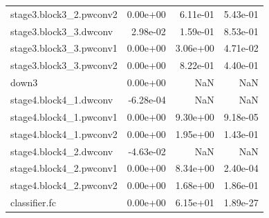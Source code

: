 \begin{longtable}{lrrr}
stage3.block3_2.pwconv2 & 0.00e+00 & 6.11e-01 & 5.43e-01 \\
stage3.block3_3.dwconv & 2.98e-02 & 1.59e-01 & 8.53e-01 \\
stage3.block3_3.pwconv1 & 0.00e+00 & 3.06e+00 & 4.71e-02 \\
stage3.block3_3.pwconv2 & 0.00e+00 & 8.22e-01 & 4.40e-01 \\
down3 & 0.00e+00 & NaN & NaN \\
stage4.block4_1.dwconv & -6.28e-04 & NaN & NaN \\
stage4.block4_1.pwconv1 & 0.00e+00 & 9.30e+00 & 9.18e-05 \\
stage4.block4_1.pwconv2 & 0.00e+00 & 1.95e+00 & 1.43e-01 \\
stage4.block4_2.dwconv & -4.63e-02 & NaN & NaN \\
stage4.block4_2.pwconv1 & 0.00e+00 & 8.34e+00 & 2.40e-04 \\
stage4.block4_2.pwconv2 & 0.00e+00 & 1.68e+00 & 1.86e-01 \\
classifier.fc & 0.00e+00 & 6.15e+01 & 1.89e-27 \\
\end{longtable}
